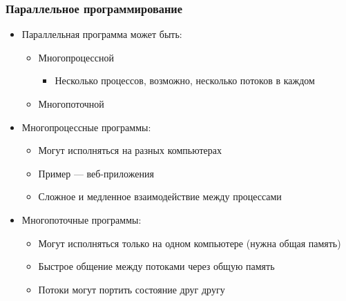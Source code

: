 \documentclass{../../slides-style}
\begin{document}
    \begin{frame}
        \frametitle{Параллельное программирование}
        \begin{itemize}
            \item Параллельная программа может быть:
            \begin{itemize}
                \item Многопроцессной
                \begin{itemize}
                    \item Несколько процессов, возможно, несколько потоков в каждом
                \end{itemize}
                \item Многопоточной
            \end{itemize}
            \item Многопроцессные программы:
            \begin{itemize}
                \item Могут исполняться на разных компьютерах
                \item Пример --- веб-приложения
                \item Сложное и медленное взаимодействие между процессами
            \end{itemize}
            \item Многопоточные программы:
            \begin{itemize}
                \item Могут исполняться только на одном компьютере (нужна общая память)
                \item Быстрое общение между потоками через общую память
                \item Потоки могут портить состояние друг другу
            \end{itemize}
        \end{itemize}
    \end{frame}
\end{document}
